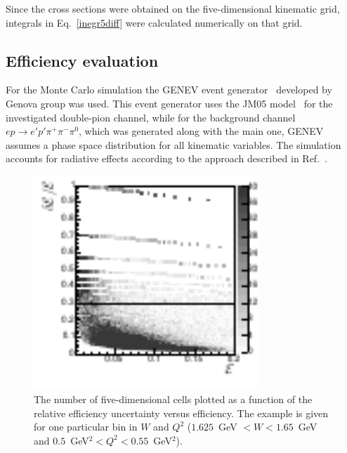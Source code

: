 \documentclass[prc,twocolumn,superscriptaddress,showpacs,amssymb,amsmath,amsfonts,aps,nofootinbib]{revtex4-1}
\begin{document}
Since the cross sections were obtained on the
five-dimensional kinematic grid,
integrals in Eq.~\eqref{inegr5diff} were calculated numerically 
on that grid. 









\subsection{Efficiency evaluation}
\label{eff_err}

For the Monte Carlo simulation the GENEV event generator~\cite{Genev} developed by 
Genova group was used. This event generator uses the JM05 model~\cite{Mokeev:2005re} for the investigated double-pion channel,
while for the background channel $e p \rightarrow e'p'\pi^{+}\pi^{-}\pi^{0}$, which was generated along with the main one, GENEV assumes a phase space distribution for all kinematic variables. The simulation accounts for radiative effects according to the approach described in Ref.~\cite{Mo:1968cg}.



\begin{figure}[htp]
\begin{center}
\includegraphics[width=8.5cm,clip,trim={0 1mm 0 0}]{pictures/efficiency/eff_err_draw.pdf}
\caption{\small The number of five-dimensional cells plotted as a function of the relative efficiency uncertainty versus efficiency. The example is given for one particular bin in $W$ and $Q^2$ ($1.625$~GeV $< W < 1.65$~GeV and $0.5$~GeV$^{2} < Q^{2} < 0.55$~GeV$^{2}$).} \label{fig:eff_err}
\end{center}
\end{figure}
\end{document}
